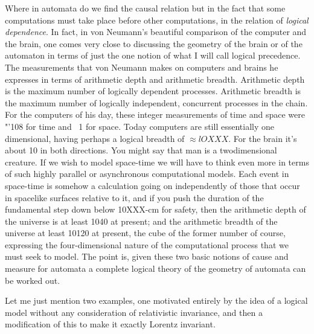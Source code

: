 Where in automata do we find the causal relation but in the fact that some
computations must take place before other computations, in the relation of
\emph{logical dependence}. In fact, in von Neumann's beautiful comparison of the
computer and the brain, one comes very close to discussing the geometry of the
brain or of the automaton in terms of just the one notion of what I will call
logical precedence. The measurements that von Neumann makes on computers and
brains he expresses in terms of arithmetic depth and arithmetic breadth.
Arithmetic depth is the maximum number of logically dependent processes.
Arithmetic breadth is the maximum number of logically independent, concurrent
processes in the chain. For the computers of his day, these integer measurements
of time and space were "'108 for time and ~1 for space. Today computers are still
essentially one dimensional, having perhaps a logical breadth of $\approx lOXXX$. For the
brain it's about 10 in both directions. You might say that man is a
two­dimensional creature. If we wish to model space-time we will have to think
even more in terms of such highly parallel or asynchronous computational models.
Each event in space-time is somehow a calculation going on independently of those
that occur in spacelike surfaces relative to it, and if you push the duration of
the fundamental step down below 10XXX-cm for safety, then the arithmetic depth of
the universe is at least 1040 at present; and the arithmetic breadth of the
universe at least 10120 at present, the cube of the former number of course,
expressing the four-dimensional nature of the computational process that we must
seek to model. The point is, given these two basic notions of cause and measure
for automata a complete logical theory of the geometry of automata can be worked
out.

Let me just mention two examples, one motivated entirely by the idea of a logical
model without any consideration of relativistic invariance, and then a
modification of this to make it exactly Lorentz invariant.

